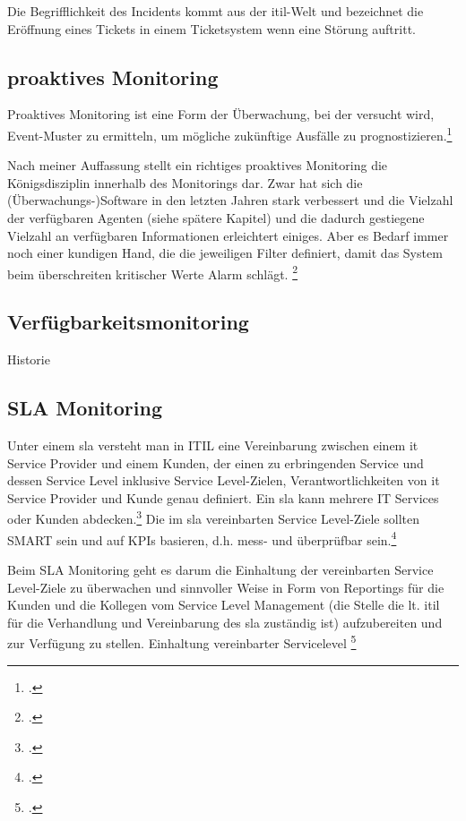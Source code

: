 \documentclass[12pt,a4paper,parskip,listof=totoc,bibliography=totoc]{scrreprt}
\begin{document}
	Die Begrifflichkeit des Incidents kommt aus der \acrshort{itil}-Welt und bezeichnet die Eröffnung eines Tickets in einem Ticketsystem wenn eine Störung auftritt.
	 
	\subsection{proaktives Monitoring}
	\glqq Proaktives Monitoring ist eine Form der Überwachung, bei der versucht wird, Event-Muster zu ermitteln, um mögliche zukünftige Ausfälle zu prognostizieren.\grqq \footcite[S. 511]{ebelitilv3}
	
	Nach meiner Auffassung stellt ein richtiges proaktives Monitoring die Königsdisziplin innerhalb des Monitorings dar. Zwar hat sich die (Überwachungs-)Software in den letzten Jahren stark verbessert und die Vielzahl der verfügbaren Agenten (siehe spätere Kapitel) und die dadurch gestiegene Vielzahl an verfügbaren Informationen erleichtert einiges. Aber es Bedarf immer noch einer kundigen Hand, die die jeweiligen Filter definiert, damit das System beim überschreiten kritischer Werte Alarm schlägt. \footcite{Borkmann2009}
	\subsection{Verfügbarkeitsmonitoring}
	Historie
	\subsection{SLA Monitoring}
	Unter einem \acrfull{sla} versteht man in ITIL eine \glqq Vereinbarung zwischen einem \acrshort{it} Service Provider und einem Kunden, der einen zu erbringenden Service und dessen Service Level inklusive Service Level-Zielen, Verantwortlichkeiten von \acrshort{it} Service Provider und Kunde genau definiert. Ein \acrshort{sla} kann mehrere IT Services oder Kunden abdecken.\grqq \footcite[S. 732; Stichwort: Service Level Agreement]{ebelitilv3} Die im \acrshort{sla} vereinbarten Service Level-Ziele sollten SMART sein und auf KPIs basieren, d.h. mess- und überprüfbar sein.\footcite[S. 733; Stichwort: Service Level-Ziele]{ebelitilv3}
	
	Beim SLA Monitoring geht es darum die Einhaltung der vereinbarten Service Level-Ziele zu überwachen und sinnvoller Weise in Form von Reportings für die Kunden und die Kollegen vom Service Level Management (die Stelle die lt. \acrshort{itil} für die Verhandlung und Vereinbarung des \acrshort{sla} zuständig ist) aufzubereiten und zur Verfügung zu stellen.
	Einhaltung vereinbarter Servicelevel \footcite[40]{iso20000sla}
\end{document}
